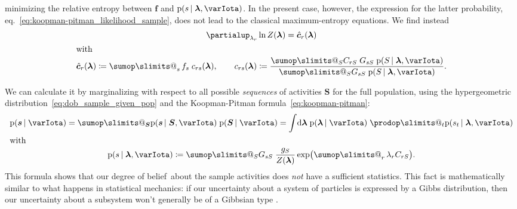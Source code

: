 \documentclass[\ifafour a4paper,12pt,\else a5paper,10pt,\fi%
onecolumn,oneside,article,%
british%
]{memoir}
\makeatletter
\theoremstyle{remark}
\theoremstyle{innote}
\def\sum{\DOTSI\sumop\slimits@}
\def\prod{\DOTSI\prodop\slimits@}
\newcommand*{\citep}{\parencites}
\newcommand*{\de}{\partialup}%
\newcommand*{\di}{\mathrm{d}}%
\newcommand*{\RR}{\bm{\mathrm{R}}}
\newcommand*{\defd}{\coloneqq}
\newcommand*{\pf}{\mathrm{p}}%
\renewcommand*{\|}{\nonscript\,\vert\nonscript\;\mathopen{}}
\newcommand*{\eqn}{eq.}%
\newcommand*{\tsum}{\mathop{\textstyle\sum}\nolimits}
\newcommand*{\dob}{degree of belief}
\newcommand*{\yS}{S}
\newcommand*{\ySt}{\bm{\yS}}
\newcommand*{\ys}{s}
\newcommand*{\yst}{\bm{\ys}}
\newcommand*{\yll}{\lambda}
\newcommand*{\yl}{\bm{\lambda}}
\newcommand*{\yg}{g}
\newcommand*{\yI}{\varIota}
\newcommand*{\yf}{\bm{f}}
\newcommand*{\yccs}{\Hat{\bm{c}}}
\makeatother
\begin{document}
minimizing the relative entropy between $\yf$ and $\pf(\ys \| \yl, \yI)$.
In the present case, however, the expression for the latter probability,
\eqn~\eqref{eq:koopman-pitman_likelihood_sample}, does not lead to the
classical maximum-entropy equations. We find instead
\begin{subequations}
  \label{eq:minimize_lagrangian}
  \begin{gather}
    \de_{\yll_{r}}\ln Z(\yl) = \yccs_{r}(\yl)
    \\
    \shortintertext{with}
   \yccs_{r}(\yl) \defd
   \tsum_{\ys} f_{\ys}\; c_{r\ys}(\yl),
   \qquad
    c_{r\ys}(\yl) \defd \frac{
      \sum_{\yS} C_{r\yS}\; G_{\ys\yS}\;\pf(\yS \| \yl, \yI)
    }{
      \sum_{\yS} G_{\ys\yS}\;\pf(\yS \| \yl, \yI)
    }.
  \end{gather}
\end{subequations}




We can calculate it by marginalizing with respect
to all possible \emph{sequences} of activities $\ySt$ for the full
population, using the hypergeometric
distribution~\eqref{eq:dob_sample_given_pop} and the Koopman-Pitman
formula~\eqref{eq:koopman-pitman}:
\begin{subequations}
  \label{eq:koopman-pitman_sample}
  \begin{gather}
      \pf( \yst \| \yI) =\sum_{\ySt} \pf(\yst \| \ySt, \yI)\;\pf(\ySt \| \yI)
=    \int\!\di\yl\; \pf(\yl \| \yI)\; \prod_{t}\pf(\ys_{t} \| \yl, \yI)
    \label{eq:koopman-pitman_integral_sample}
    \\
    \shortintertext{with}
    \pf(\ys \| \yl, \yI) \defd
\sum_{\yS} G_{\ys\yS}\;
    \frac{\yg_{\yS}}{Z(\yl)}
    \exp\bigl(\tsum_{r} \yll_r C_{r\yS}\bigr).
    \label{eq:koopman-pitman_likelihood_sample}
  \end{gather}
\end{subequations}
This formula shows that our \dob\ about the sample activities does
\emph{not} have a sufficient statistics. This fact is mathematically
similar to what happens in statistical mechanics: if our uncertainty about
a system of particles is expressed by a Gibbs distribution, then our
uncertainty about a subsystem won't generally be of a Gibbsian type
\citep{maesetal1999}.
\end{document}
